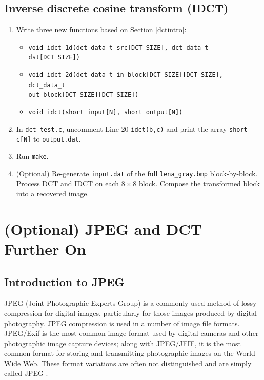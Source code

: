 \documentclass[a4paper,12pt,twoside]{article}
\begin{document}
\subsection{Inverse discrete cosine transform (IDCT)}\label{S3idct}
\begin{enumerate}
    \item Write three new functions based on Section \ref{dctintro}:
    \begin{itemize}
        \item \texttt{void idct\_1d(dct\_data\_t src[DCT\_SIZE], dct\_data\_t dst[DCT\_SIZE])}
        \item \texttt{void idct\_2d(dct\_data\_t in\_block[DCT\_SIZE][DCT\_SIZE], dct\_data\_t\\
        out\_block[DCT\_SIZE][DCT\_SIZE])}
        \item \texttt{void idct(short input[N], short output[N])} 
    \end{itemize}
    \item In \texttt{dct\_test.c}, uncomment Line 20 \texttt{idct(b,c)} and print the array \texttt{short c[N]} to \texttt{output.dat}.
    \item Run \texttt{make}.
    \item (Optional) Re-generate \texttt{input.dat} of the full \texttt{lena\_gray.bmp} block-by-block. Process DCT and IDCT on each $8\times8$ block. Compose the transformed block into a recovered image.
\end{enumerate}

\newpage
\section{(Optional) JPEG and DCT Further On}\label{Sopt1}
\subsection{Introduction to JPEG}
JPEG (Joint Photographic Experts Group) is a commonly used method of lossy compression for digital images, particularly for those images produced by digital photography. JPEG compression is used in a number of image file formats. JPEG/Exif is the most common image format used by digital cameras and other photographic image capture devices; along with JPEG/JFIF, it is the most common format for storing and transmitting photographic images on the World Wide Web. These format variations are often not distinguished and are simply called JPEG \cite{enwiki:1113230705}.
\end{document}
